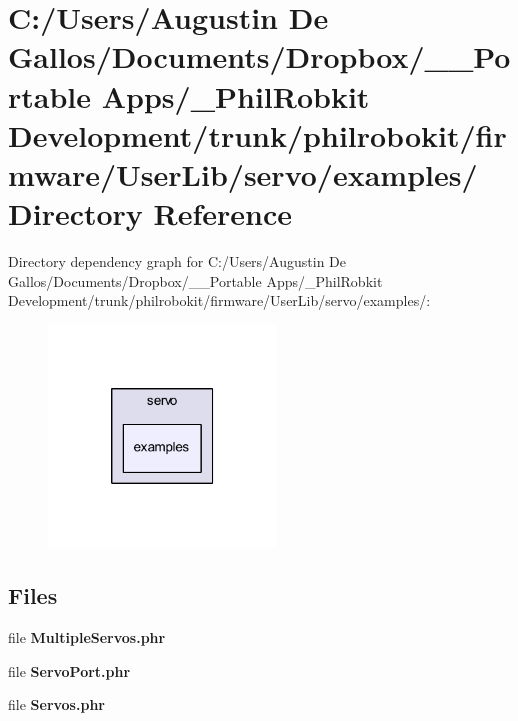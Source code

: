 \section{C\-:/\-Users/\-Augustin De Gallos/\-Documents/\-Dropbox/\-\_\-\-\_\-\-Portable Apps/\-\_\-\-Phil\-Robkit Development/trunk/philrobokit/firmware/\-User\-Lib/servo/examples/ Directory Reference}
\label{dir_5bb631d526fb150ad8fd561afc129cf7}
Directory dependency graph for C\-:/\-Users/\-Augustin De Gallos/\-Documents/\-Dropbox/\-\_\-\-\_\-\-Portable Apps/\-\_\-\-Phil\-Robkit Development/trunk/philrobokit/firmware/\-User\-Lib/servo/examples/\-:\nopagebreak
\begin{figure}[H]
\begin{center}
\leavevmode
\includegraphics[width=172pt]{dir_5bb631d526fb150ad8fd561afc129cf7_dep}
\end{center}
\end{figure}
\subsection*{Files}
\begin{DoxyCompactItemize}
\item 
file {\bf Multiple\-Servos.\-phr}
\item 
file {\bf Servo\-Port.\-phr}
\item 
file {\bf Servos.\-phr}
\end{DoxyCompactItemize}
